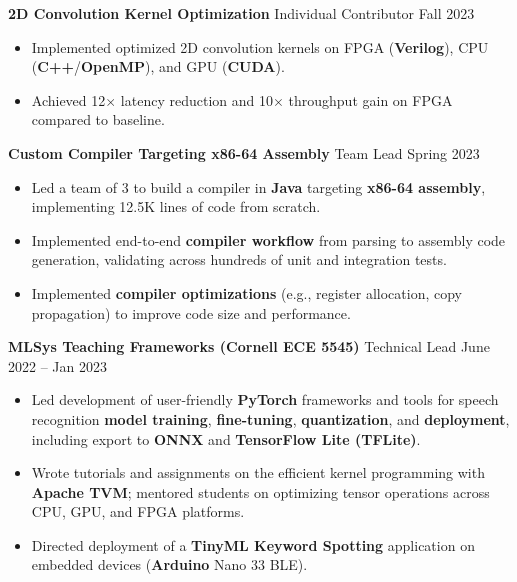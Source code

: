 \documentclass[letterpaper,10pt]{article}
\newcommand{\experienceBulletListStart}{\begin{itemize}[leftmargin=0.3in, label=$\bullet$, topsep=2pt, itemsep=0.2em, parsep=0pt]}
\newcommand{\experienceBulletListEnd}{\end{itemize}\vspace{4pt}}
\newcommand{\projectTitleWithRole}[3]{
    \textbf{#1} \hspace{0.5em} \normalsize{#2} \hfill #3
    \vspace{-2pt}
}
\begin{document}
\projectTitleWithRole{2D Convolution Kernel Optimization}{Individual Contributor}{Fall 2023}
\experienceBulletListStart
\item\normalsize{Implemented optimized 2D convolution kernels on FPGA (\textbf{Verilog}), CPU (\textbf{C++}/\textbf{OpenMP}), and GPU (\textbf{CUDA}).}
\item\normalsize{Achieved 12$\times$ latency reduction and 10$\times$ throughput gain on FPGA compared to baseline.}
\experienceBulletListEnd

\projectTitleWithRole{Custom Compiler Targeting x86-64 Assembly}{Team Lead}{Spring 2023}
\experienceBulletListStart
\item\normalsize{Led a team of 3 to build a compiler in \textbf{Java} targeting \textbf{x86-64 assembly}, implementing 12.5K lines of code from scratch.}
\item\normalsize{Implemented end-to-end \textbf{compiler workflow} from parsing to assembly code generation, validating across hundreds of unit and integration tests.}
\item\normalsize{Implemented \textbf{compiler optimizations} (e.g., register allocation, copy propagation) to improve code size and performance.}
\experienceBulletListEnd

\projectTitleWithRole{MLSys Teaching Frameworks (Cornell ECE 5545)}{Technical Lead}{June 2022 – Jan 2023}
\experienceBulletListStart
\item\normalsize{Led development of user-friendly \textbf{PyTorch} frameworks and tools for speech recognition \textbf{model training}, \textbf{fine-tuning}, \textbf{quantization}, and \textbf{deployment}, including export to \textbf{ONNX} and \textbf{TensorFlow Lite (TFLite)}.}
  \item\normalsize{Wrote tutorials and assignments on the efficient kernel programming with \textbf{Apache TVM}; mentored students on optimizing tensor operations across CPU, GPU, and FPGA platforms.}
  \item\normalsize{Directed deployment of a \textbf{TinyML Keyword Spotting} application on embedded devices (\textbf{Arduino} Nano 33 BLE).}
\experienceBulletListEnd
\end{document}
